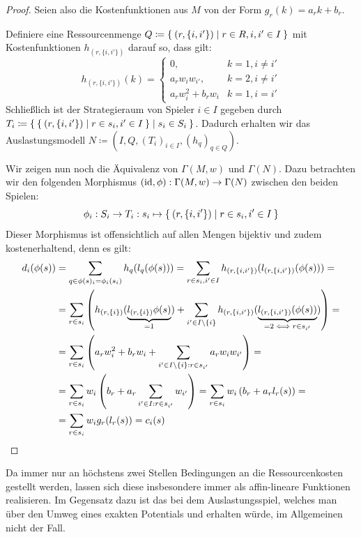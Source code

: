 \begin{proof}
	Seien also die Kostenfunktionen aus $M$ von der Form $g_r(k) = a_r k + b_r$.
	
	Definiere eine Ressourcenmenge $Q \coloneqq \Set{(r, \{i, i'\}) | r \in R, i,i' \in I}$ mit Kostenfunktionen $h_{(r, \{i,i'\})}$ darauf so, dass gilt:
		\[h_{(r, \{i,i'\})} (k) = \begin{cases}
			0, 					& k=1, i \neq i' \\
			a_r w_i w_{i'}, 	& k=2, i \neq i' \\
			a_r w_i^2 + b_r w_i	& k=1, i = i'
		\end{cases} \]
	Schließlich ist der Strategieraum von Spieler $i \in I$ gegeben durch $T_i \coloneqq \Set{\Set{(r, \{i, i'\}) | r \in s_i, i' \in I} | s_i \in S_i }$. Dadurch erhalten wir das Auslastungsmodell $N \coloneqq (I, Q, (T_i)_{i \in I}, (h_q)_{q \in Q})$. 
	
	Wir zeigen nun noch die Äquivalenz von $\Gamma(M,w)$ und $\Gamma(N)$. Dazu betrachten wir den folgenden Morphismus $(\mathrm{id}, \phi): \Gamma(M,w) \to \Gamma(N)$ zwischen den beiden Spielen:
		\[\phi_i: S_i \to T_i: s_i \mapsto \Set{(r, \{i, i'\}) | r \in s_i, i' \in I}\]
	Dieser Morphismus ist offensichtlich auf allen Mengen bijektiv und zudem kostenerhaltend, denn es gilt:
	\begin{align*}
		d_i(\phi(s)) 	&= \sum_{q \in \phi(s)_i = \phi_i(s_i)} h_q(l_q(\phi(s))) = \sum_{r \in s_i, i' \in I} h_{(r, \{i,i'\})}(l_{(r, \{i,i'\})}(\phi(s))) = \\
						&= \sum_{r \in s_i} \left(h_{(r, \{i\})}(\underbrace{l_{(r, \{i\})}\phi(s)}_{=1}) + \sum_{i' \in I\setminus\{i\}} h_{(r, \{i, i'\})}(\underbrace{l_{(r, \{i, i'\})}(\phi(s))}_{=2 \iff r \in s_{i'}})\right) = \\
						&= \sum_{r \in s_i}\left( a_r w_i^2 + b_r w_i + \sum_{i' \in I\setminus\{i\}: r \in s_{i'}} a_r w_i w_{i'}\right) = \\
						&= \sum_{r \in s_i}w_i \left( b_r + a_r \sum_{i' \in I: r \in s_{i'}}w_{i'} \right) = \sum_{r \in s_i}w_i \left( b_r + a_r l_r(s)\right) = \\
						&= \sum_{r \in s_i}w_i g_r(l_r(s)) = c_i(s) \qedhere
	\end{align*}
\end{proof}

\begin{bem}
	Da immer nur an höchstens zwei Stellen Bedingungen an die Ressourcenkosten gestellt werden, lassen sich diese insbesondere immer als affin-lineare Funktionen realisieren. Im Gegensatz dazu ist das bei dem Auslastungsspiel, welches man über den Umweg eines exakten Potentials und  erhalten würde, im Allgemeinen nicht der Fall.
\end{bem}

